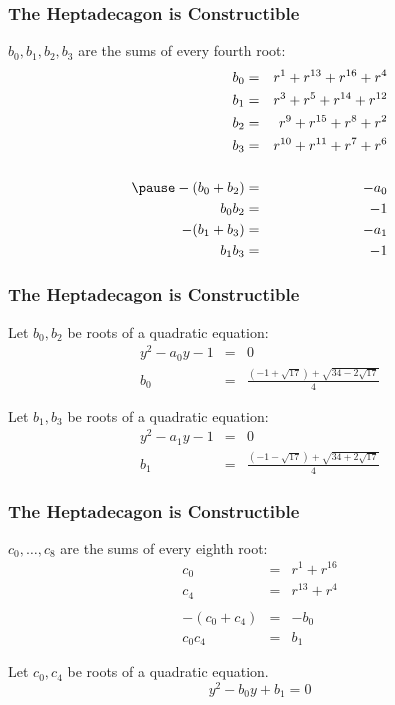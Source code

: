 \documentclass{beamer}
\begin{document}

\begin{frame}
\frametitle{The Heptadecagon is Constructible}

\bigskip

$b_0,b_1, b_2, b_3$ are the sums of every fourth root:
\begin{eqnarray*}
b_0&=& r^1+ r^{13} + r^{16} + r^4\\
b_1&=& r^3+ r^{5} + r^{14} + r^{12}\\
b_2&=& r^9+ r^{15} + r^{8} + r^2\\
b_3&=& r^{10}+ r^{11} + r^{7} + r^6\\\\
\pause
-(b_0+b_2)&=&-a_0\\
b_0b_2&=&-1\\
-(b_1+b_3)&=&-a_1\\
b_1b_3&=&-1
\end{eqnarray*}
\end{frame}


\begin{frame}
\frametitle{The Heptadecagon is Constructible}

Let $b_0,b_2$ be roots of a quadratic equation:
\begin{eqnarray*}
y^2-a_0y-1&=& 0\\
b_0&=&\frac{(-1+\sqrt{17}) + \sqrt{34-2\sqrt{17}}}{4}
\end{eqnarray*}

Let $b_1,b_3$ be roots of a quadratic equation:
\begin{eqnarray*}
y^2-a_1y-1&=& 0\\
b_1&=&\frac{(-1-\sqrt{17}) + \sqrt{34+2\sqrt{17}}}{4}
\end{eqnarray*}

\end{frame}


\begin{frame}
\frametitle{The Heptadecagon is Constructible}

\bigskip

$c_0,\ldots, c_8$ are the sums of every eighth root:
\begin{eqnarray*}
c_0&=&r^1+r^{16}\\
c_4&=&r^{13}+r^4\\\\
-(c_0+c_4)&=&-b_0\\
c_0c_4&=&b_1
\end{eqnarray*}

Let $c_0,c_4$ be roots of a quadratic equation.
\[
y^2-b_0y+b_1=0
\]

\end{frame}
\end{document}
